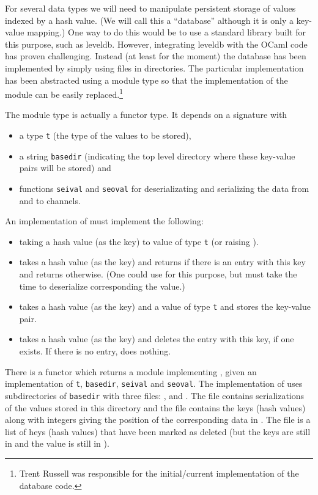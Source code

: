 For several data types we will need to manipulate persistent storage of values 
indexed by a hash value. (We will call this a ``database'' although 
it is only a key-value mapping.)
One way to do this would be to use a standard library built for this purpose,
such as leveldb.
However, integrating leveldb with the OCaml code has proven challenging.
Instead (at least for the moment) the database has been implemented
by simply using files in directories.
The particular implementation has been abstracted using a module type
so that the implementation of the module can be easily replaced.\footnote{Trent Russell was responsible for the initial/current implementation of the database code.}

The module type {} is actually a functor type.
It depends on a signature with
\begin{itemize}
\item a type {\tt{t}} (the type of the values to be stored),
\item a string {\tt{basedir}} (indicating the top level directory where these key-value pairs will be stored) and
\item functions {\tt{seival}} and {\tt{seoval}} for deserializating and serializing the data from and to channels.
\end{itemize}
An implementation of {} must implement the following:
\begin{itemize}
\item {} taking a hash value (as the key) to value of type {\tt{t}} (or raising {}).
\item {} takes a hash value (as the key) and returns {} if there is an entry with this key and returns {} otherwise. (One could use {} for this purpose, but {} must take the time to deserialize corresponding the value.)
\item {} takes a hash value (as the key) and a value of type {\tt{t}} and stores the key-value pair.
\item {} takes a hash value (as the key) and deletes the entry with this key, if one exists. If there is no entry, {} does nothing.
\end{itemize}

There is a functor {} which returns
a module implementing {}, given an implementation of {\tt{t}}, {\tt{basedir}}, {\tt{seival}} and {\tt{seoval}}.
The implementation of {}
uses subdirectories of {\tt{basedir}}
with three files: {},
{}
and {}.
The file {} contains serializations of the values stored in this directory
and the file {} contains the keys (hash values) along with integers giving
the position of the corresponding data in {}.
The file {} is a list of heys (hash values)
that have been marked as deleted (but the keys are still in {}
and the value is still in {}).

